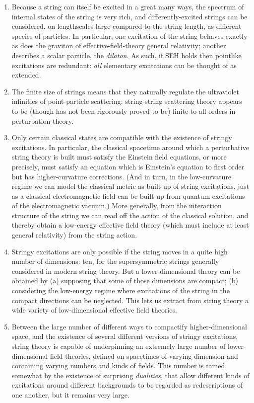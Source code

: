 \documentclass{article}
\begin{document}
\begin{enumerate}
\item Because a string can itself be excited in a great many ways, the spectrum of internal states of the string is very rich, and differently-excited strings can be considered, on lengthscales large compared to the string length, as different species of particles. In particular, one excitation of the string behaves exactly as does the graviton of effective-field-theory general relativity; another describes a scalar particle, the \emph{dilaton}. As such, if SEH holds then pointlike excitations are redundant: \emph{all} elementary excitations can be thought of as extended.
\item The finite size of strings means that they naturally regulate the ultraviolet infinities of point-particle scattering: string-string scattering theory appears to be (though has not been rigorously proved to be) finite to all orders in perturbation theory.
\item Only certain classical states are compatible with the existence of stringy excitations. In particular, the classical spacetime around which a perturbative string theory is built must satisfy the Einstein field equations, or more precisely, must satisfy an equation which is Einstein's equation to first order but has higher-curvature corrections. (And in turn, in the low-curvature regime we can model the classical metric as built up of string excitations, just as a classical electromagnetic field can be built up from quantum excitations of the electromagnetic vacuum.)  More generally, from the interaction structure of the string we can read off the action of the classical solution, and thereby obtain a low-energy effective field theory (which must include at least general relativity) from the string action.
\item Stringy excitations are only possible if the string moves in a quite high number of dimensions: ten, for the supersymmetric strings generally considered in modern string theory. But a lower-dimensional theory can be obtained by (a) supposing that some of those dimensions are compact; (b) considering the low-energy regime where excitations of the string in the compact directions can be neglected. This lets us extract from string theory a wide variety of low-dimensional effective field theories.
\item Between the large number of different ways to compactify higher-dimensional space, and the existence of several different versions of stringy excitations, string theory is capable of underpinning an extremely large number of lower-dimensional field theories, defined on spacetimes of varying dimension and containing varying numbers and kinds of fields. This number is tamed somewhat by the existence of surprising \emph{dualities}, that allow different kinds of excitations around different backgrounds to be regarded as redescriptions of one another, but it remains very large.

\end{enumerate}
\end{document}
